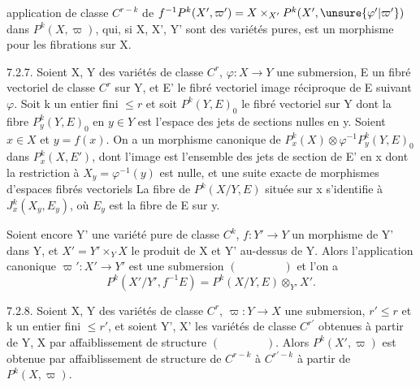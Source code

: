 
application de classe $C^{r-k}$ de $f^{-1}P^k(X',\varpi')=X\times_{X'}P^k(X',\unsure{\varphi'|\varpi'})$ dans $P^k(X,\varpi)$, qui, si X, X', Y' sont des variétés pures, est un morphisme pour les fibrations sur X.

7.2.7. Soient X, Y des variétés de classe $C^r$, $\varphi:X\longrightarrow Y$ une submersion, E un fibré vectoriel de classe $C^r$ sur Y, et E' le fibré vectoriel image réciproque de E suivant $\varphi$. Soit k un entier fini $\leq r$ et soit $P^k(Y,E)_0$ le fibré vectoriel sur Y dont la fibre $P_y^k(Y,E)_0$ en $y\in Y$ est l'espace des jets de sections nulles en y. Soient $x\in X$ et $y=f(x)$. On a un morphisme canonique de $P_x^k(X)\otimes\varphi^{-1}P_y^k(Y,E)_0$ dans $P_x^k(X,E')$, dont l'image est l'ensemble des jets de section de E' en x dont la restriction à $X_y=\varphi^{-1}(y)$ est nulle, et une suite exacte de morphismes d'espaces fibrés vectoriels
La fibre de $P^k(X/Y,E)$ située sur x s'identifie à $J_x^k(X_y,E_y)$, où $E_y$ est la fibre de E sur y.

Soient encore Y' une variété pure de classe $C^k$, $f:Y'\longrightarrow Y$ un morphisme de Y' dans Y, et $X'=Y'\times_Y X$ le produit de X et Y' au-dessus de Y. Alors l'application canonique $\varpi':X'\longrightarrow Y'$ est une submersion $(\qquad\qquad)$ et l'on a
\[
P^k(X'/Y',f^{-1}E)=P^k(X/Y,E)\otimes_{Y'}X'.
\]

7.2.8. Soient X, Y des variétés de classe $C^r$, $\varpi:Y\longrightarrow X$ une submersion, $r'\leq r$ et k un entier fini $\leq r'$, et soient Y', X' les variétés de classe $C^{r'}$ obtenues à partir de Y, X par affaiblissement de structure $(\qquad\qquad)$. Alors $P^k(X',\varpi)$ est obtenue par affaiblissement de structure de $C^{r-k}$ à $C^{r'-k}$ à partir de $P^k(X,\varpi)$.

